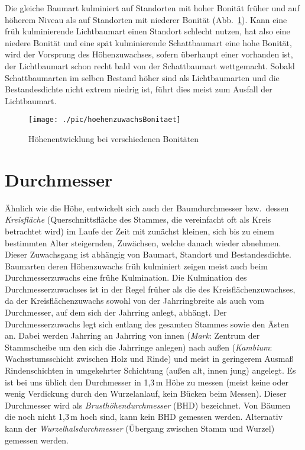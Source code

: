 \documentclass[twocolumn]{scrartcl}
\begin{document}
Die gleiche Baumart kulminiert auf Standorten mit hoher Bonität früher und auf
höherem Niveau als auf Standorten mit niederer Bonität
(Abb.~\ref{fig:hoeheAlterBonitaeten}). Kann eine früh kulminierende Lichtbaumart
einen Standort schlecht nutzen, hat also eine niedere Bonität und eine spät
kulminierende Schattbaumart eine hohe Bonität, wird der Vorsprung des
Höhenzuwachses, sofern überhaupt einer vorhanden ist, der Lichtbaumart schon
recht bald von der Schattbaumart wettgemacht. Sobald Schattbaumarten im selben
Bestand höher sind als Lichtbaumarten und die Bestandesdichte nicht extrem
niedrig ist, führt dies meist zum Ausfall der Lichtbaumart.

\begin{figure}[htbp]
  \centering
  \texttt{[image: ./pic/hoehenzuwachsBonitaet]}
  \caption{Höhenentwicklung bei verschiedenen Bonitäten}
  \label{fig:hoeheAlterBonitaeten}
\end{figure}


\section{Durchmesser}

Ähnlich wie die Höhe, entwickelt sich auch der Baumdurchmesser bzw.\ dessen
\emph{Kreisfläche} (Querschnittsfläche des Stammes, die
vereinfacht oft als Kreis betrachtet wird) im Laufe der Zeit mit zunächst
kleinen, sich bis zu einem bestimmten Alter steigernden, Zuwächsen, welche
danach wieder abnehmen. Dieser Zuwachsgang ist abhängig von Baumart, Standort
und Bestandesdichte. Baumarten deren Höhenzuwachs früh kulminiert zeigen meist
auch beim Durchmesserzuwachs eine frühe Kulmination. Die Kulmination des
Durchmesserzuwachses ist in der Regel früher als die des Kreisflächenzuwachses,
da der Kreisflächenzuwachs sowohl von der Jahrringbreite als auch vom
Durchmesser, auf dem sich der Jahrring anlegt, abhängt. Der Durchmesserzuwachs
legt sich entlang des gesamten Stammes sowie den Ästen an. Dabei werden Jahrring
an Jahrring von innen (\emph{Mark}: Zentrum der Stammscheibe um den
sich die Jahrringe anlegen) nach außen (\emph{Kambium}:
Wachsstumsschicht zwischen Holz und Rinde) und meist in geringerem Ausmaß
Rindenschichten in umgekehrter Schichtung (außen alt, innen jung) angelegt. Es
ist bei uns üblich den Durchmesser in 1,3\,m Höhe zu messen (meist keine oder
wenig Verdickung durch den Wurzelanlauf, kein Bücken beim Messen). Dieser
Durchmesser wird als
\emph{Brusthöhendurchmesser}
(BHD) bezeichnet. Von Bäumen die noch nicht
1,3\,m hoch sind, kann kein BHD gemessen werden. Alternativ kann der
\emph{Wurzelhalsdurchmesser} (Übergang zwischen
Stamm und Wurzel) gemessen werden.
\end{document}
